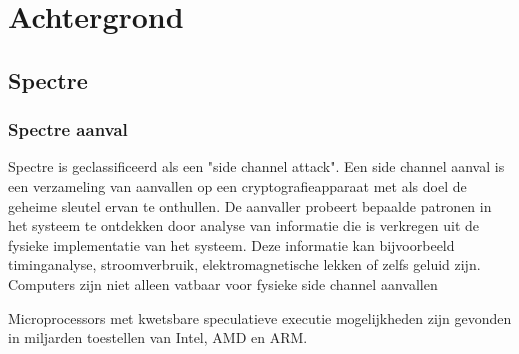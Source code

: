 
\chapter{Achtergrond}



\section{Spectre}

\subsection{Spectre aanval}
Spectre is geclassificeerd als een "side channel attack".
Een side channel aanval is een verzameling van aanvallen op een cryptografieapparaat met als doel de geheime sleutel ervan te onthullen. De aanvaller probeert bepaalde patronen in het systeem te ontdekken door analyse van informatie die is verkregen uit de fysieke implementatie van het systeem. Deze informatie kan bijvoorbeeld timinganalyse, stroomverbruik, elektromagnetische lekken of zelfs geluid zijn. \parencite{Touhafi2011}
Computers zijn niet alleen vatbaar voor fysieke side channel aanvallen

Microprocessors met kwetsbare speculatieve executie mogelijkheden zijn gevonden in miljarden toestellen van Intel, AMD en ARM.

